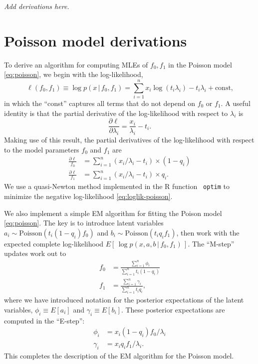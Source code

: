 \documentclass[final]{siamart171218}
\begin{document}
{\em Add derivations here.}

\section{Poisson model derivations}

To derive an algorithm for computing MLEs of $f_0, f_1$ in the Poisson
model \eqref{eq:poisson}, we begin with the log-likelihood,
\begin{equation}
\ell(f_0, f_1) \equiv \log p(x \,|\, f_0, f_1) = 
\sum_{i=1}^n x_i \log (t_i \lambda_i) - t_i \lambda_i +
\mbox{const,}
\label{eq:loglik-poisson}
\end{equation}
in which the ``const'' captures all terms that do not depend on $f_0$
or $f_1$. A useful identity is that the partial derivative of the
log-likelihood with respect to $\lambda_i$ is
\begin{equation*}
\frac{\partial\ell}{\partial\lambda_i} = \frac{x_i}{\lambda_i} - t_i.
\end{equation*}
Making use of this result, the partial derivatives of the
log-likelihood with respect to the model parameters $f_0$ and $f_1$
are
\begin{align}
\frac{\partial\ell}{f_0} &= 
\sum_{i=1}^n (x_i/\lambda_i - t_i) \times (1-q_i) \\
\frac{\partial\ell}{f_1} &= 
\sum_{i=1}^n (x_i/\lambda_i - t_i) \times q_i.
\end{align}
We use a quasi-Newton method implemented in the R function {\tt
  optim} to minimize the negative log-likelihood
\eqref{eq:loglik-poisson}.

We also implement a simple EM algorithm for fitting the Poison model
\eqref{eq:poisson}. The key is to introduce latent variables $a_i \sim
\mathrm{Poisson}(t_i (1-q_i) f_0)$ and $b_i \sim \mathrm{Poisson}(t_i
q_i f_1)$, then work with the expected complete log-likelihood
$E[\,\log p(x, a, b \,|\, f_0, f_1)\,]$. The ``M-step'' updates work
out to
\begin{align}
f_0 &= \frac{\sum_{i=1}^n \phi_i}{\sum_{i=1}^n t_i(1-q_i)} \\
f_1 &= \frac{\sum_{i=1}^n \gamma_i}{\sum_{i=1}^n t_i q_i},
\end{align}
where we have introduced notation for the posterior expectations of
the latent variables, $\phi_i \equiv E[a_i]$ and $\gamma_i \equiv
E[b_i]$. These posterior expectations are computed in the ``E-step'':
\begin{align}
\phi_i   &= x_i (1 - q_i) f_0 / \lambda_i \\
\gamma_i &= x_i q_i f_1 / \lambda_i.
\end{align}
This completes the description of the EM algorithm for the Poisson
model.
\end{document}
